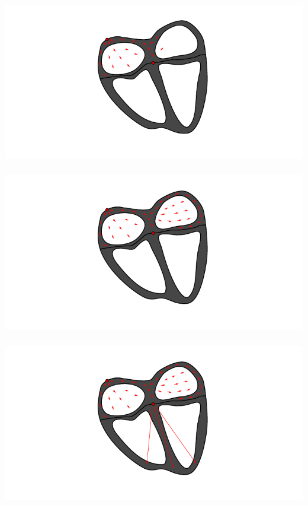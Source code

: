 \documentclass[norsk, 12pt]{beamer}
\begin{document}
\begin{frame}[fragile]
\frametitle{}
\begin{center}
\includegraphics[width=\textwidth]{ecg2}
\end{center}
\end{frame}

\begin{frame}[fragile]
\frametitle{}
\begin{center}
\includegraphics[width=\textwidth]{ecg3}
\end{center}
\end{frame}

\begin{frame}[fragile]
\frametitle{}
\begin{center}
\includegraphics[width=\textwidth]{ecg4}
\end{center}
\end{frame}
\end{document}
